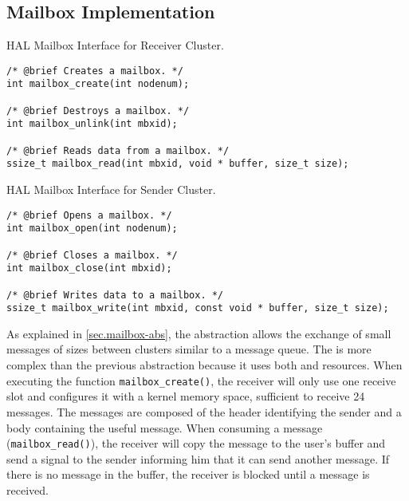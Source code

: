 			\subsection*{Mailbox Implementation}

\begin{listing}[!tb]
\caption{HAL Mailbox Interface for Receiver Cluster.}
\label{code:mailbox-receiver}
\begin{verbatim}
/* @brief Creates a mailbox. */
int mailbox_create(int nodenum);

/* @brief Destroys a mailbox. */
int mailbox_unlink(int mbxid);

/* @brief Reads data from a mailbox. */
ssize_t mailbox_read(int mbxid, void * buffer, size_t size);
\end{verbatim}
\end{listing}

\begin{listing}[!tb]
\caption{HAL Mailbox Interface for Sender Cluster.}
\label{code:mailbox-sender}
\begin{verbatim}
/* @brief Opens a mailbox. */
int mailbox_open(int nodenum);

/* @brief Closes a mailbox. */
int mailbox_close(int mbxid);

/* @brief Writes data to a mailbox. */
ssize_t mailbox_write(int mbxid, const void * buffer, size_t size);
\end{verbatim}
\end{listing}

				As explained in \autoref{sec.mailbox-abs}, the \mailbox abstraction
				allows the exchange of small messages of sizes between clusters similar
				to a \posix message queue.
				The \mailbox is more complex than the previous abstraction because it
				uses both \dnoc and \cnoc resources.
				When executing the function \texttt{mailbox\_create()}, the receiver
				will only use one \dnoc receive slot and configures it with a kernel
				memory space, sufficient to receive 24 messages.
				The messages are composed of the header identifying the sender
				and a body containing the useful message.
				When consuming a message (\texttt{mailbox\_read()}), the receiver
				will copy the message to the user's buffer and send a signal
				to the sender informing him that it can send another message.
				If there is no message in the buffer, the receiver is blocked
				until a message is received.


